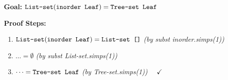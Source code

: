 \documentclass[10pt,a4paper]{article}
\begin{document}
\begin{tcolorbox}[title={2. Base Case ($t = \text{Leaf}$)}]
\textbf{Goal:} $\text{\texttt{List-set}}(\text{\texttt{inorder Leaf}}) = \text{\texttt{Tree-set Leaf}}$

\textbf{Proof Steps:}
\begin{enumerate}[leftmargin=1.5em, itemsep=2pt]
    \item $\text{\texttt{List-set}}(\text{\texttt{inorder Leaf}}) = \text{\texttt{List-set []}}$ \quad \textit{(by subst inorder.simps(1))}
    \item $\dots = \emptyset$ \quad \textit{(by subst List-set.simps(1))}
    \item $\dots = \text{\texttt{Tree-set Leaf}}$ \quad \textit{(by Tree-set.simps(1))} $\quad \checkmark$
\end{enumerate}
\end{tcolorbox}

\vspace{0.3em}
\end{document}
